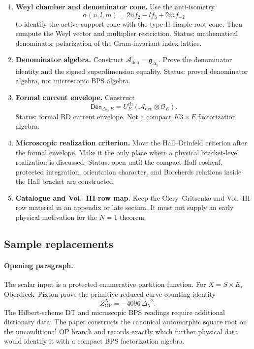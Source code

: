 \begin{enumerate}
\item \textbf{Weyl chamber and denominator cone.}
Use the anti-isometry
$$
\alpha(n,l,m)=2nf_2-lf_3+2mf_{-2}
$$
to identify the active-support cone with the type-II simple-root cone.
Then compute the Weyl vector and multiplier restriction.  Status:
mathematical denominator polarization of the Gram-invariant index
lattice.

\item \textbf{Denominator algebra.}
Construct \(\mathcal A_{\mathrm{den}}=\mathfrak g_{\Delta_5}\).  Prove
the denominator identity and the signed superdimension equality.  Status:
proved denominator algebra, not microscopic BPS algebra.

\item \textbf{Formal current envelope.}
Construct
$$
\mathsf{Den}_{\Delta_5,E}
=U_E^{\mathrm{ch}}(\mathcal A_{\mathrm{den}}\otimes\mathcal O_E).
$$
Status: formal BD current envelope.  Not a compact \(K3\times E\)
factorization algebra.

\item \textbf{Microscopic realization criterion.}
Move the Hall--Drinfeld criterion after the formal envelope.  Make it the
only place where a physical bracket-level realization is discussed.
Status: open until the compact Hall cosheaf, protected integration,
orientation character, and Borcherds relations inside the Hall bracket
are constructed.

\item \textbf{Catalogue and Vol.~III row map.}
Keep the Clery--Gritsenko and Vol.~III row material in an appendix or
late section.  It must not supply an early physical motivation for the
\(N=1\) theorem.
\end{enumerate}

\subsection{Sample replacements}

\paragraph{Opening paragraph.}
The scalar input is a protected enumerative partition function.  For
\(X=S\times E\), Oberdieck--Pixton prove the primitive reduced
curve-counting identity
$$
Z^X_{\mathrm{OP}}=-4096\,\Delta_5^{-2}.
$$
The Hilbert-scheme DT and microscopic BPS readings require additional
dictionary data.  The paper constructs the canonical automorphic square
root on the unconditional OP branch and records exactly which further
physical data would identify it with a compact BPS factorization
algebra.

